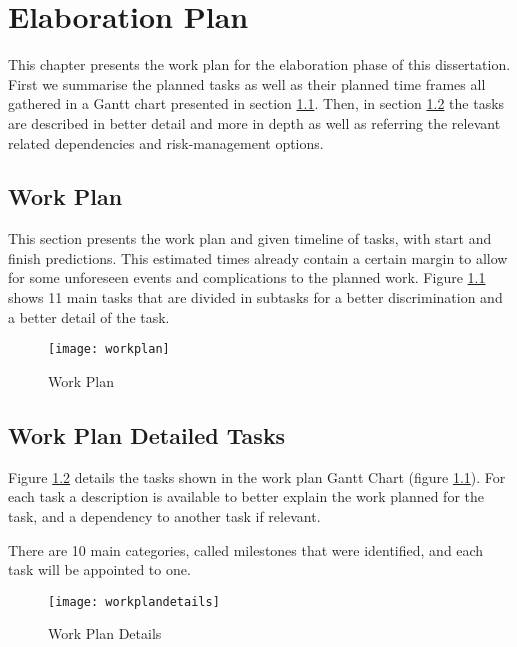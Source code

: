 \chapter{Elaboration Plan}
\label{cha:elaboration_plan}

This chapter presents the work plan for the elaboration phase of this dissertation. First we summarise the planned tasks as well as their planned time frames all gathered in a Gantt chart presented in section \ref{sec:workplan}. Then, in section \ref{sec:workplan_details} the tasks are described in better detail and more in depth as well as referring the relevant related dependencies and risk-management options.

\section{Work Plan}
\label{sec:workplan}

This section presents the work plan and given timeline of tasks, with start and finish predictions. This estimated times already contain a certain margin to allow for some unforeseen events and complications to the planned work. Figure \ref{fig:work_plan} shows 11 main tasks that are divided in subtasks for a better discrimination and a better detail of the task.

\begin{figure}[htbp]
	\centerline{\texttt{[image: workplan]}}%
	\caption{Work Plan}
	\label{fig:work_plan}
\end{figure}

\section{Work Plan Detailed Tasks}
\label{sec:workplan_details}

Figure \ref{fig:workplan_details} details the tasks shown in the work plan Gantt Chart (figure \ref{fig:work_plan}). For each task a description is available to better explain the work planned for the task, and a dependency to another task if relevant.

There are 10 main categories, called milestones that were identified, and each task will be appointed to one.

\begin{figure}[htbp]
	\centerline{\texttt{[image: workplandetails]}}%
	\caption{Work Plan Details}
	\label{fig:workplan_details}
\end{figure}
